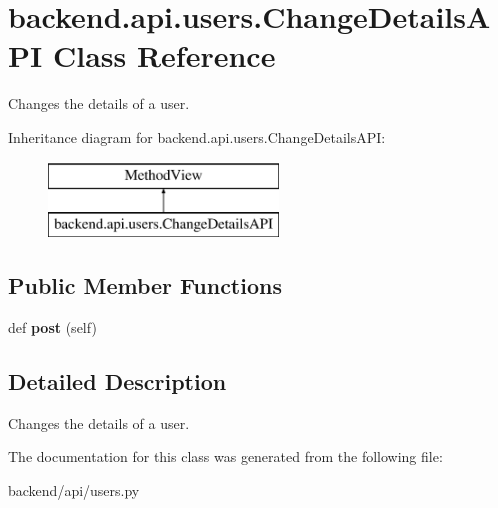 \hypertarget{classbackend_1_1api_1_1users_1_1_change_details_a_p_i}{}\section{backend.\+api.\+users.\+Change\+Details\+A\+P\+I Class Reference}
\label{classbackend_1_1api_1_1users_1_1_change_details_a_p_i}


Changes the details of a user.  


Inheritance diagram for backend.\+api.\+users.\+Change\+Details\+A\+P\+I\+:\begin{figure}[H]
\begin{center}
\leavevmode
\includegraphics[height=2.000000cm]{classbackend_1_1api_1_1users_1_1_change_details_a_p_i}
\end{center}
\end{figure}
\subsection*{Public Member Functions}
\begin{DoxyCompactItemize}
\item 
\hypertarget{classbackend_1_1api_1_1users_1_1_change_details_a_p_i_a17513c65c03380112f147e3eddfd2c74}{}def {\bfseries post} (self)\label{classbackend_1_1api_1_1users_1_1_change_details_a_p_i_a17513c65c03380112f147e3eddfd2c74}

\end{DoxyCompactItemize}


\subsection{Detailed Description}
Changes the details of a user. 

The documentation for this class was generated from the following file\+:\begin{DoxyCompactItemize}
\item 
backend/api/users.\+py\end{DoxyCompactItemize}
